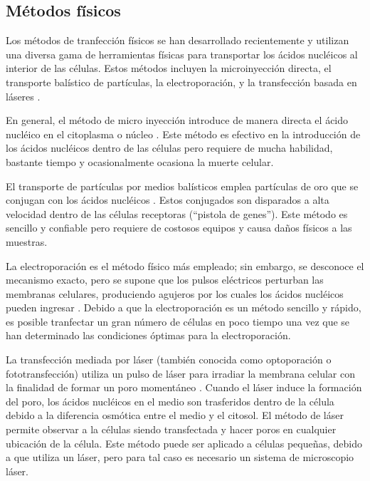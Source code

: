 \documentclass[fleqn,10pt]{SelfArx} %
\begin{document}
\subsection{Métodos físicos}
Los métodos de tranfección físicos se han desarrollado recientemente y utilizan una diversa gama de herramientas físicas para transportar los ácidos nucléicos al interior de las células. Estos métodos incluyen la microinyección directa, el transporte balístico de partículas, la electroporación, y la transfección basada en láseres \cite{Mehier-Humbert:2005aa}.  

En general, el método de micro inyección introduce de manera directa el ácido nucléico en el citoplasma o núcleo \cite{Martinou:1995aa, Ikeda:1995aa}. Este método es efectivo en la introducción de los ácidos nucléicos dentro de las células pero requiere de mucha habilidad, bastante tiempo y ocasionalmente ocasiona la muerte celular. 

El transporte de partículas por medios balísticos emplea partículas de oro que se conjugan con los ácidos nucléicos \cite{Lo:1994aa, OBrien:2006aa}. Estos conjugados son disparados a alta velocidad dentro de las células receptoras (``pistola de genes''). Este método es sencillo y confiable pero requiere de costosos equipos y causa daños físicos a las muestras. 

La electroporación es el método físico más empleado; sin embargo, se desconoce el mecanismo exacto, pero se supone que los pulsos eléctricos perturban las membranas celulares, produciendo agujeros por los cuales los ácidos nucléicos pueden ingresar \cite{Inoue:2001aa}. Debido a que la electroporación es un método sencillo y rápido, es posible tranfectar un gran número de células en poco tiempo una vez que se han determinado las condiciones óptimas para la electroporación. 

La transfección mediada por láser (también conocida como optoporación o fototransfección) utiliza un pulso de láser para irradiar la membrana celular con la finalidad de formar un poro momentáneo \cite{Shirahata:2001aa, Barrett:2006aa}. Cuando el láser induce la formación del poro, los ácidos nucléicos en el medio son trasferidos dentro de la célula debido a la diferencia osmótica entre el medio y el citosol. El método de láser permite observar a la células siendo transfectada y hacer poros en cualquier ubicación de la célula. Este método puede ser aplicado a células pequeñas, debido a que utiliza un láser, pero para tal caso es necesario un sistema de microscopio láser. 
\end{document}
